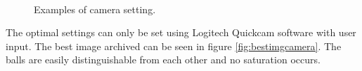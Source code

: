 \begin{figure}[htpb]
\centering
{}
\\

\caption{Examples of camera setting.}
\label{fig:wrongcamera}
\end{figure} 

The optimal settings can only be set using Logitech Quickcam software with user input. The best image archived can be seen in figure  \ref{fig:bestimgcamera}. The balls are easily distinguishable from each other and no saturation occurs.

